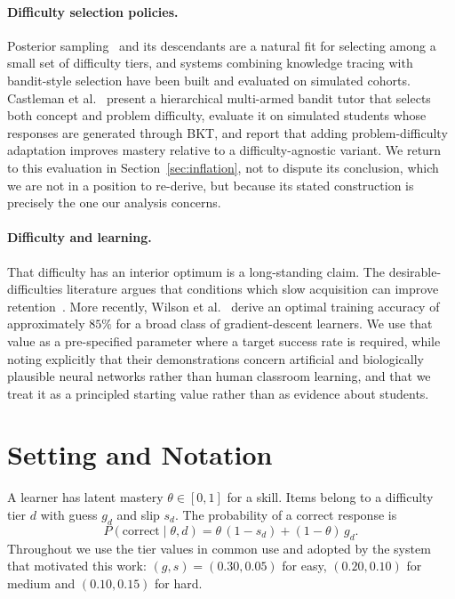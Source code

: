 \documentclass[notitlepage,12pt]{jedm}
\begin{document}
\paragraph{Difficulty selection policies.} Posterior sampling~\cite{thompson1933likelihood} and its descendants are a natural fit for selecting among a small set of difficulty tiers, and systems combining knowledge tracing with bandit-style selection have been built and evaluated on simulated cohorts. Castleman et al.\ \cite{castleman2024hierarchical} present a hierarchical multi-armed bandit tutor that selects both concept and problem difficulty, evaluate it on simulated students whose responses are generated through BKT, and report that adding problem-difficulty adaptation improves mastery relative to a difficulty-agnostic variant. We return to this evaluation in Section~\ref{sec:inflation}, not to dispute its conclusion, which we are not in a position to re-derive, but because its stated construction is precisely the one our analysis concerns.

\paragraph{Difficulty and learning.} That difficulty has an interior optimum is a long-standing claim. The desirable-difficulties literature argues that conditions which slow acquisition can improve retention~\cite{schmidt1992new}. More recently, Wilson et al.\ \cite{wilson2019eighty} derive an optimal training accuracy of approximately $85\%$ for a broad class of gradient-descent learners. We use that value as a pre-specified parameter where a target success rate is required, while noting explicitly that their demonstrations concern artificial and biologically plausible neural networks rather than human classroom learning, and that we treat it as a principled starting value rather than as evidence about students.

\section{Setting and Notation}
\label{sec:setting}

A learner has latent mastery $\theta \in [0,1]$ for a skill. Items belong to a difficulty tier $d$ with guess $g_d$ and slip $s_d$. The probability of a correct response is
\begin{equation}
P(\text{correct} \mid \theta, d) = \theta\,(1 - s_d) + (1 - \theta)\,g_d .
\label{eq:response}
\end{equation}
Throughout we use the tier values in common use and adopted by the system that motivated this work: $(g,s) = (0.30, 0.05)$ for easy, $(0.20, 0.10)$ for medium and $(0.10, 0.15)$ for hard.
\end{document}
